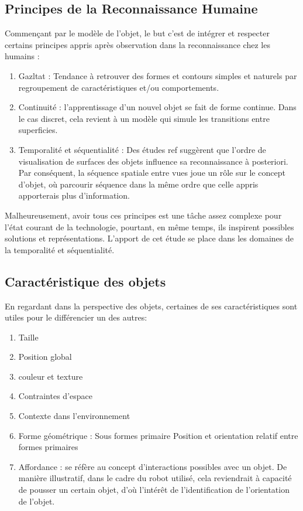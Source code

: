 {\color {green}
  \subsection {Principes de la Reconnaissance Humaine}

  Commençant par le modèle de l'objet, le but c'est de intégrer et
  respecter certains principes appris après observation dans la
  reconnaissance chez les humains :

  \begin{enumerate}
  \item Gazltat : Tendance à retrouver des formes et contours simples et
    naturels par regroupement de caractéristiques et/ou comportements.

  \item Continuité : l'apprentissage d'un nouvel objet se fait de forme
    continue. Dans le cas discret, cela revient à un modèle qui simule les
    transitions entre superficies.

  \item Temporalité et séquentialité : Des études {\color{blue} ref} suggèrent que l'ordre
    de visualisation de surfaces des objets influence sa reconnaissance à
    posteriori. Par conséquent, la séquence spatiale entre vues joue un rôle sur le concept d'objet, où parcourir
    séquence dans la même ordre que celle appris apporterais plus d'information.

  \end{enumerate}

  Malheureusement, avoir tous ces principes est une tâche assez complexe
  pour l’état courant de la technologie, pourtant, en même temps, ils inspirent
  possibles solutions et représentations. L'apport de cet étude se place dans les
  domaines de la temporalité et séquentialité.

  \subsection{Caractéristique des objets} 

  En regardant dans la perspective des objets, certaines de ses caractéristiques sont utiles pour le différencier un des autres:

  \begin {enumerate}
  \item Taille
  \item Position global
  \item couleur et texture
  \item Contraintes d’espace
  \item Contexte dans l'environnement
  \item Forme géométrique : 
    \subitem Sous formes primaire 
    \subitem Position et orientation relatif entre formes primaires
  \item Affordance : se réfère au concept d’interactions possibles
    avec un objet. De manière illustratif, dans le cadre du robot utilisé,
    cela reviendrait à capacité de pousser un certain objet, d’où
    l’intérêt de l’identification de l’orientation de l’objet.
  \end{enumerate} 
}

